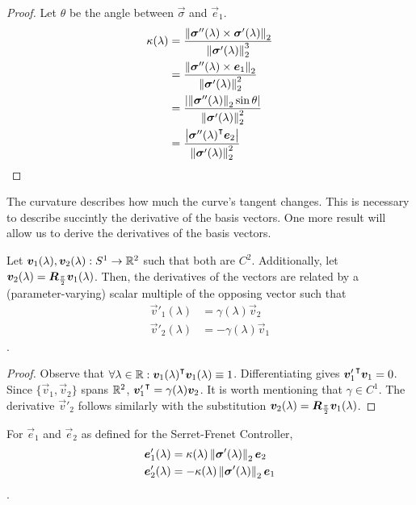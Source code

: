 \documentclass[oneside, 11pt]{book}
\begin{document}
\begin{proof}
    Let $\theta$ be the angle between $\vec{\sigma}$ and $\vec{e}_1$.
    \begin{align*}
        \kappa(\lambda) &= \frac{\mathop{}\!\left\|\bm{\sigma}''(\lambda) \times \bm{\sigma}'(\lambda)\right\|_2}{\mathop{}\!\left\|\bm{\sigma}'(\lambda)\right\|_2^3}\\
                        &= \frac{\mathop{}\!\left\|\bm{\sigma}''(\lambda) \times \bm{e}_1\right\|_2}{\mathop{}\!\left\|\bm{\sigma}'(\lambda)\right\|_2^2}\\
                        &= \frac{\left|\mathop{}\!\left\|\bm{\sigma}''(\lambda)\right\|_2\sin \theta \right|}{\mathop{}\!\left\|\bm{\sigma}'(\lambda)\right\|_2^2}\\
                        &= \frac{\left|{\bm{\sigma}''(\lambda)}^{\intercal}\bm{e}_2\right|}{\mathop{}\!\left\|\bm{\sigma}'(\lambda)\right\|_2^2}\\
    \end{align*}
\end{proof}
The curvature describes how much the curve's tangent changes. This is necessary to describe succintly the derivative of the basis vectors. One more result will allow us to derive the derivatives of the basis vectors.
\begin{lemma}
    Let $\bm{v}_1(\lambda), \bm{v}_2(\lambda):S^1\to\mathbb{R}^2$ such that both are $C^2$. Additionally, let $\bm{v}_2(\lambda)=\bm{R}_{\frac{\pi}{2}}\bm{v}_1(\lambda)$. Then, the derivatives of the vectors are related by a (parameter-varying) scalar multiple of the opposing vector such that
    \begin{align*}
        \vec{v}'_1(\lambda) &= \gamma(\lambda)\vec{v}_2 \\
        \vec{v}'_2(\lambda) &= -\gamma(\lambda)\vec{v}_1
    \end{align*}.
    \label{lem:sf_frame}
\end{lemma}
\begin{proof}
    Observe that $\forall \lambda\in\mathbb{R} : {\bm{v}_1(\lambda)}^{\intercal}\bm{v}_1(\lambda)\equiv 1$. Differentiating gives ${\bm{v}'_1}^{\intercal}\bm{v}_1=0$. Since $\{\vec{v}_1,\vec{v}_2\}$ spans $\mathbb{R}^2$, ${\bm{v}'_1}^{\intercal}=\gamma(\lambda)\bm{v}_2$. It is worth mentioning that $\gamma\in C^1$. The derivative $\vec{v}'_2$ follows similarly with the substitution $\bm{v}_2(\lambda)=\bm{R}_{\frac{\pi}{2}}\bm{v}_1(\lambda)$.
\end{proof}
\begin{corollary}
    For $\vec{e}_1$ and $\vec{e}_2$ as defined for the Serret-Frenet Controller,
    \begin{align*}
        \bm{e}'_1(\lambda) &= \kappa(\lambda)\mathop{}\!\left\|\bm{\sigma}'(\lambda)\right\|_2\bm{e}_2 \\
        \bm{e}'_2(\lambda) &= -\kappa(\lambda)\mathop{}\!\left\|\bm{\sigma}'(\lambda)\right\|_2\bm{e}_1
    \end{align*}.
    \label{cor:der_frame}
\end{corollary}
\end{document}
